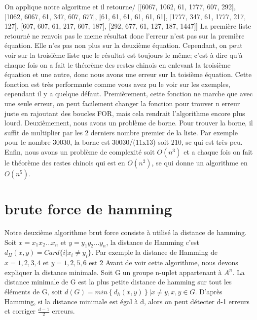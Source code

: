 \documentclass[a4paper, 11pt]{report}
\begin{document}
On applique notre algoritme et il retourne/
[[6067, 1062, 61, 1777, 607, 292], [1062, 6067, 61, 347, 607, 677], [61, 61, 61, 61, 61, 61], [1777, 347, 61, 1777, 217, 127], [607, 607, 61, 217, 607, 187], [292, 677, 61, 127, 187, 1447]] \newline
La première liste retourné ne renvois pas le meme résultat donc l'erreur n'est pas sur la première équation. Elle n'es pas non plus sur la deuxième équation.
Cependant, on peut voir sur la troisième liste que le résultat est toujours le même; c'est à dire qu'à chaque fois on a fait le théorème des restes chinois en enlevant la troisième équation et une autre, donc nous avons une erreur sur la toisième équation.
\newline
Cette fonction est très performante comme vous avez pu le voir sur les exemples, cependant il y a quelque défaut. Premièrement, cette fonction ne marche que avec une seule erreur,
on peut facilement changer la fonction pour trouver n erreur juste en rajoutant des boucles FOR, mais cela rendrait l'algorithme encore plus lourd. Deuxièmement, nous avons un problème de borne. Pour trouver la borne,
il suffit de multiplier par les 2 derniers nombre premier de la liste. \newline
Par exemple pour le nombre 30030, la borne est 30030/(11x13) soit 210, se qui est très peu.\newline
Enfin, nous avons un problème de complexité soit $O(n^3)$ et a chaque fois on fait le théorème des restes chinois qui est en $O(n^2)$, se qui donne un algorithme en $O(n^5)$.




\newpage
\section{brute force de hamming}

Notre deuxième algorithme brut force consiste à utilisé la distance de hamming. Soit $x=x_1x_2 ... x_n$ et $y=y_1y_2 ... y_n$, la distance de Hamming c'est
$d_H(x,y)=Card\{  i\vert x_i \neq y_i \}$. Par exemple la distance de Hamming de $x={1,2,3,4}$ et $y={1,2,5,6}$ est 2\newline
Avant de voir cette algorithme, nous devons expliquer la distance minimale. Soit G un groupe n-uplet appartenant à $A^n$. La distance minimale de G est la plus petite distance de hamming sur tout les éléments de G, soit $d(G)=min{\left\{d_h(x,y)\right\} | x\neq y, x,y\in G}$.
D'après Hamming, si la distance minimale est égal à d, alors on peut détecter d-1 erreurs et corriger $\frac{d-1}{2}$ erreurs. \newline
\end{document}
